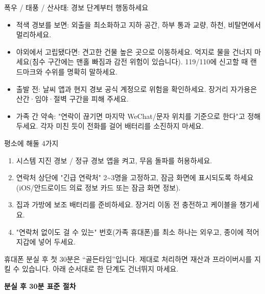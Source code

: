 \begin{tcbwarn}{폭우 / 태풍 / 산사태: 경보 단계부터 행동하세요}
\begin{itemize}
  \item 적색 경보를 보면: 외출을 최소화하고 지하 공간, 하부 통과 교량, 하천, 비탈면에서 멀리하세요.
  \item 야외에서 고립됐다면: 견고한 건물 높은 곳으로 이동하세요. 억지로 물을 건너지 마세요(침수 구간에는 맨홀 빠짐과 감전 위험이 있습니다). 119/110에 신고할 때 랜드마크와 수위를 명확히 말하세요.
  \item 출발 전: 날씨 앱과 현지 경보 공식 계정으로 위험을 확인하세요. 장거리 자가용은 산간·임야·절벽 구간을 피해 주세요.
  \item 가족 간 약속: "연락이 끊기면 마지막 WeChat/문자 위치를 기준으로 한다"고 정해 두세요. 각자 미친 듯이 전화를 걸어 배터리를 소진하지 마세요.
\end{itemize}

\end{tcbwarn}

\begin{tcbpractice}{평소에 해둘 4가지}
\begin{enumerate}
  \item 시스템 지진 경보 / 정규 경보 앱을 켜고, 무음 돌파를 허용하세요.
  \item 연락처 상단에 "긴급 연락처" 2\textasciitilde{}3명을 고정하고, 잠금 화면에 표시되도록 하세요(iOS/안드로이드 의료 정보 카드 또는 잠금 화면 정보).
  \item 집과 가방에 보조 배터리를 준비하세요. 장거리 이동 전 충전하고 케이블을 챙기세요.
  \item "연락처 없이도 걸 수 있는" 번호(가족 휴대폰)를 최소 하나는 외우고, 종이에 적어 지갑에 넣어 두세요.
\end{enumerate}

\end{tcbpractice}


휴대폰 분실 후 첫 30분은 “골든타임”입니다. 제대로 처리하면 재산과 프라이버시를 지킬 수 있습니다. 아래 순서대로 한 단계도 건너뛰지 마세요.

\textbf{분실 후 30분 표준 절차}\par

